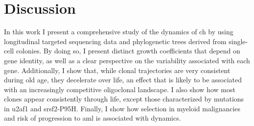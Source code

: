 \begin{figure}[!ht]
	\label{fig:ch-risk-selection}
\end{figure}

\FloatBarrier

\section{Discussion}

In this work I present a comprehensive study of the dynamics of \ac{ch} by using longitudinal targeted sequencing data and phylogenetic trees derived from single-cell colonies. By doing so, I present distinct growth coefficients that depend on gene identity, as well as a clear perspective on the variability associated with each gene. Additionally, I show that, while clonal trajectories are very consistent during old age, they decelerate over life, an effect that is likely to be associated with an increasingly competitive oligoclonal landscape. I also show how most clones appear consistently through life, except those characterized by mutations in \ac{u2af1} and \ac{srsf2}-P95H. Finally, I show how selection in myeloid malignancies and risk of progression to \ac{aml} is associated with dynamics.

